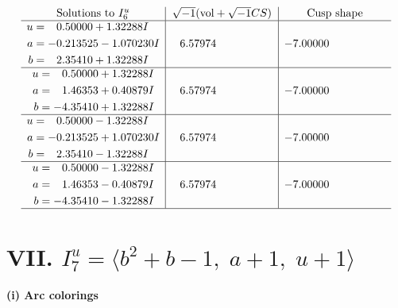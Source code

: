 \documentclass[1p]{elsarticle_modified}
\theoremstyle{definition}
\newcommand{\I}{\sqrt{-1}}
\begin{document}
$$\begin{array}{c|c|c}  
\text{Solutions to }I^u_{6}& \I (\text{vol} + \sqrt{-1}CS) & \text{Cusp shape}\\
 \hline 
\begin{aligned}
u &= \phantom{-}0.50000 + 1.32288 I \\
a &= -0.213525 - 1.070230 I \\
b &= \phantom{-}2.35410 + 1.32288 I\end{aligned}
 & \phantom{-}6.57974\phantom{ +0.000000I} & -7.00000\phantom{ +0.000000I} \\ \hline\begin{aligned}
u &= \phantom{-}0.50000 + 1.32288 I \\
a &= \phantom{-}1.46353 + 0.40879 I \\
b &= -4.35410 + 1.32288 I\end{aligned}
 & \phantom{-}6.57974\phantom{ +0.000000I} & -7.00000\phantom{ +0.000000I} \\ \hline\begin{aligned}
u &= \phantom{-}0.50000 - 1.32288 I \\
a &= -0.213525 + 1.070230 I \\
b &= \phantom{-}2.35410 - 1.32288 I\end{aligned}
 & \phantom{-}6.57974\phantom{ +0.000000I} & -7.00000\phantom{ +0.000000I} \\ \hline\begin{aligned}
u &= \phantom{-}0.50000 - 1.32288 I \\
a &= \phantom{-}1.46353 - 0.40879 I \\
b &= -4.35410 - 1.32288 I\end{aligned}
 & \phantom{-}6.57974\phantom{ +0.000000I} & -7.00000\phantom{ +0.000000I}\\
 \hline 
 \end{array}$$\newpage\newpage\renewcommand{\arraystretch}{1}
\centering \section*{VII. $I^u_{7}= \langle b^2+b-1,\;a+1,\;u+1 \rangle$}
\flushleft \textbf{(i) Arc colorings}\\
\end{document}
